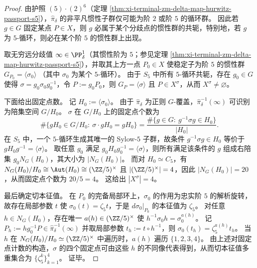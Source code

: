 \begin{proof}
由护照 \((5)\cdot(2)^6\)（定理 \ref{thm:xi-terminal-zm-delta-map-hurwitz-passport-s5}），\(\widehat\pi_\delta\) 的非平凡惯性子群仅可能为阶 \(2\) 或阶 \(5\) 的循环群。
因此若 \(g\in G\) 固定某点 \(P\in X\)，则 \(g\) 必属于某个分歧点的惯性群的共轭，特别地，若 \(g\) 为 \(5\)-循环，则必在某个阶 \(5\) 的惯性群上出现。
\par
取无穷远分歧值 \(\infty\in\PP^1_\delta\)（其惯性阶为 \(5\)；参见定理 \ref{thm:xi-terminal-zm-delta-map-hurwitz-passport-s5}），并取其上方一点 \(P_0\in X\) 使稳定子为阶 \(5\) 的惯性群
\(
G_{P_0}=\langle\sigma_0\rangle
\)
（其中 \(\sigma_0\) 为某个 \(5\)-循环）。
由于 \(S_5\) 中所有 \(5\)-循环共轭，存在 \(g_0\in G\) 使得 \(\sigma=g_0\sigma_0g_0^{-1}\)，令 \(P:=g_0P_0\)，则 \(G_P=\langle\sigma\rangle\) 且 \(P\in X^\sigma\)，从而 \(X^\sigma\neq\varnothing\)。
\par
下面给出固定点数。
记 \(H_0:=\langle\sigma_0\rangle\)。
由于 \(\widehat\pi_\delta\) 为正则 \(G\)-覆盖，\(\widehat\pi_\delta^{-1}(\infty)\) 可识别为陪集空间 \(G/H_0\)。
\(\sigma\) 在 \(G/H_0\) 上的固定点个数为
\[
\#\{gH_0\in G/H_0:\ \sigma\cdot gH_0=gH_0\}
=\frac{\#\{g\in G:\ g^{-1}\sigma g\in H_0\}}{|H_0|}.
\]
在 \(S_5\) 中，一个 \(5\)-循环生成其唯一的 Sylow-\(5\) 子群，故条件 \(g^{-1}\sigma g\in H_0\) 等价于 \(gH_0g^{-1}=\langle\sigma\rangle\)。
取任意 \(g_0\) 满足 \(g_0H_0g_0^{-1}=\langle\sigma\rangle\)，则所有满足该条件的 \(g\) 组成右陪集 \(g_0N_G(H_0)\)，其大小为 \(|N_G(H_0)|\)。
而对 \(H_0\simeq C_5\)，有
\(
N_G(H_0)/H_0\cong \Aut(H_0)\cong(\ZZ/5)^\times
\)
且 \(|(\ZZ/5)^\times|=4\)，因此 \(|N_G(H_0)|=20\)，从而固定点个数为 \(20/5=4\)。
这给出 \(|X^\sigma|=4\)。
\par
最后确定切本征值。
在 \(P_0\) 的完备局部环上，\(\sigma_0\) 的作用为忠实阶 \(5\) 的解析旋转，故存在局部参数 \(t\) 使 \(\sigma_0(t)=\zeta_5 t\)，于是 \(d\sigma_0|_{P_0}\) 的本征值为 \(\zeta_5\)。
对任意 \(h\in N_G(H_0)\)，存在唯一 \(a(h)\in(\ZZ/5)^\times\) 使 \(h^{-1}\sigma_0h=\sigma_0^{a(h)}\)。
记 \(P_h:=hg_0^{-1}P\in \widehat\pi_\delta^{-1}(\infty)\) 并取局部参数 \(t_h:=t\circ h^{-1}\)，则
\(
\sigma_0(t_h)=\zeta_5^{a(h)}t_h
\)。
当 \(h\) 在 \(N_G(H_0)/H_0\simeq(\ZZ/5)^\times\) 中遍历时，\(a(h)\) 遍历 \(\{1,2,3,4\}\)。
由上述对固定点计数的构造，\(\sigma\) 的四个固定点可由这些 \(h\) 的不同像代表得到，从而切本征值多重集合为 \(\{\zeta_5^k\}_{k=1}^4\)。
证毕。
\end{proof}

